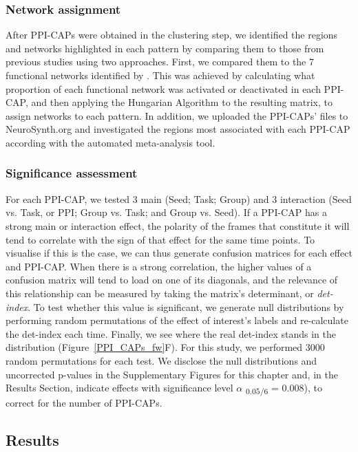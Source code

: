 \subsubsection{Network assignment}
After PPI-CAPs were obtained in the clustering step, we identified the regions and networks highlighted in each pattern by comparing them to those from previous studies using two approaches. First, we compared them to the 7 functional networks identified by \cite{Yeo2011}. This was achieved by calculating what proportion of each functional network was activated or deactivated in each PPI-CAP, and then applying the Hungarian Algorithm \cite{Munkres1957} to the resulting matrix, to assign networks to each pattern.  In addition, we uploaded the PPI-CAPs' files to NeuroSynth.org \citep{Wager2011a} and investigated the regions most associated with each PPI-CAP according with the automated meta-analysis tool. 


\subsubsection{Significance assessment}
For each PPI-CAP, we tested 3 main (Seed; Task; Group) and 3 interaction (Seed vs. Task, or PPI; Group vs. Task; and Group vs. Seed).
If a PPI-CAP has a strong main or interaction effect, the polarity of the frames that constitute it will tend to correlate with the sign of that effect for the same time points. To visualise if this is the case, we can thus generate confusion matrices for each effect and PPI-CAP. When there is a strong correlation, the higher values of a confusion matrix will tend to load on one of its diagonals, and the relevance of this relationship can be measured by taking the matrix's determinant, or \textit{det-index}. To test whether this value is significant, we generate null distributions by performing random permutations of the effect of interest's labels and re-calculate the det-index each time. Finally, we see where the real det-index stands in the distribution (Figure~\ref{PPI_CAPs_fw}F).
For this study, we performed 3000 random permutations for each test. We disclose the null distributions and uncorrected p-values in the Supplementary Figures for this chapter and, in the Results Section, indicate  effects with significance level $\alpha$ \textsubscript{$0.05/6$} = 0.008), to correct for the number of PPI-CAPs.








\subsection{Results}

